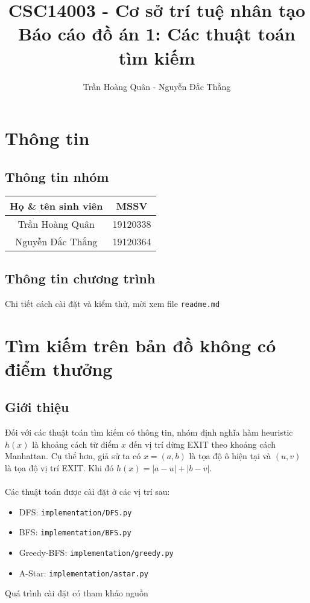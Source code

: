 \documentclass{article}
\title{
	CSC14003 - Cơ sở trí tuệ nhân tạo\\
	Báo cáo đồ án 1: Các thuật toán tìm kiếm
}
\author{Trần Hoàng Quân - Nguyễn Đắc Thắng}
\begin{document}
\maketitle
\tableofcontents
\pagebreak

\section{Thông tin}
\subsection{Thông tin nhóm}
\begin{table}[ht]
\centering
\begin{tabular}{|c|c|}
\hline
Họ \& tên sinh viên & MSSV \\
\hline
Trần Hoàng Quân & 19120338 \\
Nguyễn Đắc Thắng & 19120364 \\
\hline
\end{tabular}
\end{table}

\subsection{Thông tin chương trình}
Chi tiết cách cài đặt và kiểm thử, mời xem file \texttt{readme.md}
\section{Tìm kiếm trên bản đồ không có điểm thưởng}
\subsection{Giới thiệu}
Đối với các thuật toán tìm kiếm có thông tin, nhóm định nghĩa hàm heuristic $h(x)$ là khoảng cách từ điểm $x$ đến vị trí dừng EXIT theo khoảng cách Manhattan. Cụ thể hơn, giả sử ta có $x = (a, b)$ là tọa độ ô hiện tại và $(u, v)$ là tọa độ vị trí EXIT. Khi đó $h(x) = |a-u| + |b-v|$.
\\\\
Các thuật toán được cài đặt ở các vị trí sau:
\begin{itemize}
\item DFS: \texttt{implementation/DFS.py}
\item BFS: \texttt{implementation/BFS.py}
\item Greedy-BFS: \texttt{implementation/greedy.py}
\item A-Star: \texttt{implementation/astar.py}
\end{itemize}
Quá trình cài đặt có tham khảo nguồn \cite{redblob}
\end{document}
